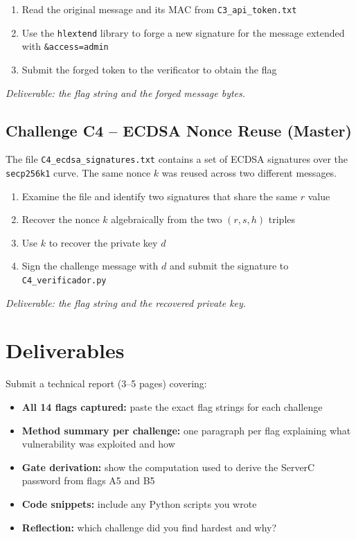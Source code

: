\documentclass[a4paper, 12pt]{article}
\begin{document}
\begin{enumerate}[leftmargin=2em]
  \item Read the original message and its MAC from \texttt{C3\_api\_token.txt}
  \item Use the \texttt{hlextend} library to forge a new signature for the
        message extended with \texttt{\&access=admin}
  \item Submit the forged token to the verificator to obtain the flag
\end{enumerate}

\textit{Deliverable: the flag string and the forged message bytes.}

\subsection{Challenge C4 -- ECDSA Nonce Reuse (Master)}

The file \texttt{C4\_ecdsa\_signatures.txt} contains a set of ECDSA signatures
over the \texttt{secp256k1} curve. The same nonce $k$ was reused across two
different messages.

\begin{enumerate}[leftmargin=2em]
  \item Examine the file and identify two signatures that share the same $r$ value
  \item Recover the nonce $k$ algebraically from the two $(r, s, h)$ triples
  \item Use $k$ to recover the private key $d$
  \item Sign the challenge message with $d$ and submit the signature to
        \texttt{C4\_verificador.py}
\end{enumerate}

\textit{Deliverable: the flag string and the recovered private key.}

\section{Deliverables}

Submit a technical report (3--5 pages) covering:

\begin{itemize}[leftmargin=1.5em]
  \item \textbf{All 14 flags captured:} paste the exact flag strings for each challenge
  \item \textbf{Method summary per challenge:} one paragraph per flag explaining
        what vulnerability was exploited and how
  \item \textbf{Gate derivation:} show the computation used to derive the ServerC
        password from flags A5 and B5
  \item \textbf{Code snippets:} include any Python scripts you wrote
  \item \textbf{Reflection:} which challenge did you find hardest and why?
\end{itemize}
\end{document}
